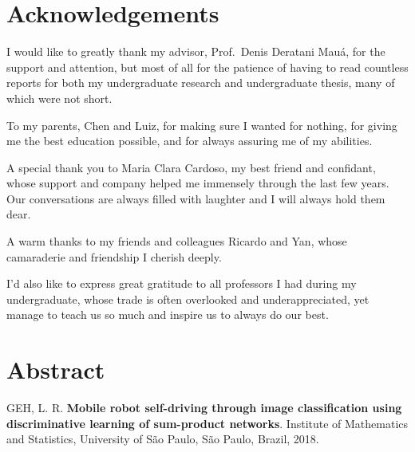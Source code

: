 \chapter*{Acknowledgements}

I would like to greatly thank my advisor, Prof.\ Denis Deratani Mauá, for the support and
attention, but most of all for the patience of having to read countless reports for both my
undergraduate research and undergraduate thesis, many of which were not short.

To my parents, Chen and Luiz, for making sure I wanted for nothing, for giving me the best
education possible, and for always assuring me of my abilities.

A special thank you to Maria Clara Cardoso, my best friend and confidant, whose support and company
helped me immensely through the last few years. Our conversations are always filled with laughter
and I will always hold them dear.

A warm thanks to my friends and colleagues Ricardo and Yan, whose camaraderie and friendship I
cherish deeply.

I'd also like to express great gratitude to all professors I had during my undergraduate, whose
trade is often overlooked and underappreciated, yet manage to teach us so much and inspire us to
always do our best.

\vfill
{}

\chapter*{Abstract}

\noindent GEH, L. R. \textbf{Mobile robot self-driving through image classification using
  discriminative learning of sum-product networks}. Institute of Mathematics and Statistics,
University of São Paulo, São Paulo, Brazil, 2018.\\

